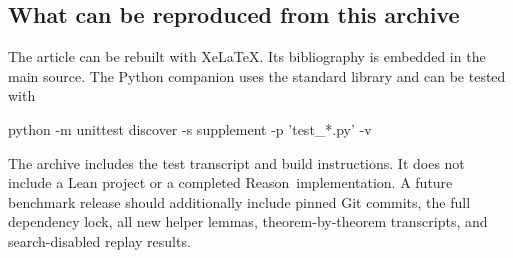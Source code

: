 \documentclass[11pt,a4paper]{article}
\newcommand{\Reason}{\textsf{Reason}}
\theoremstyle{remark}
\begin{document}
\subsection{What can be reproduced from this archive}

The article can be rebuilt with XeLaTeX. Its bibliography is embedded in the main source. The Python companion uses the standard library and can be tested with
\begin{Code}
python -m unittest discover -s supplement -p 'test_*.py' -v
\end{Code}
The archive includes the test transcript and build instructions. It does not include a Lean project or a completed \Reason\ implementation. A future benchmark release should additionally include pinned Git commits, the full dependency lock, all new helper lemmas, theorem-by-theorem transcripts, and search-disabled replay results.
\end{document}
